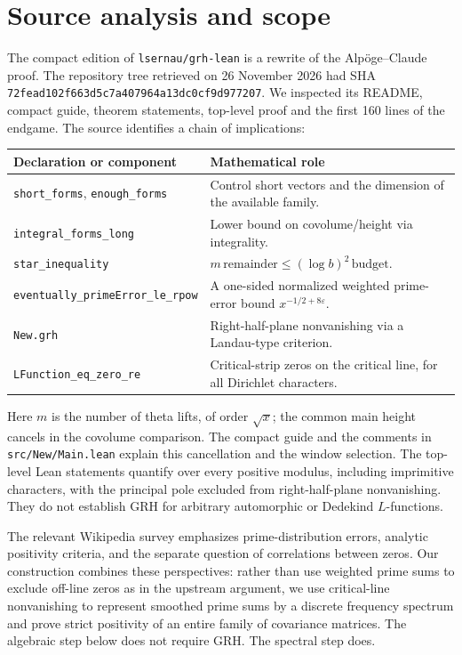 \documentclass[11pt]{article}
\theoremstyle{remark}\newtheorem{remark}[theorem]{Remark}
\begin{document}
\section{Source analysis and scope}
The compact edition of \texttt{lsernau/grh-lean} \cite{grh} is a rewrite of the Alp\"oge--Claude proof. The repository tree retrieved on 26 November 2026 had SHA \texttt{72fead102f663d5c7a407964a13dc0cf9d977207}. We inspected its README, compact guide, theorem statements, top-level proof and the first 160 lines of the endgame. The source identifies a chain of implications:
\begin{center}
\begin{tabular}{p{.39\linewidth}p{.51\linewidth}}
\toprule
Declaration or component & Mathematical role\\ \midrule
\texttt{short\_forms}, \texttt{enough\_forms} & Control short vectors and the dimension of the available family.\\
\texttt{integral\_forms\_long} & Lower bound on covolume/height via integrality.\\
\texttt{star\_inequality} & $m\,\mathrm{remainder}\le (\log b)^2\,\mathrm{budget}$.\\
\texttt{eventually\_primeError\_le\_rpow} & A one-sided normalized weighted prime-error bound $x^{-1/2+8\varepsilon}$.\\
\texttt{New.grh} & Right-half-plane nonvanishing via a Landau-type criterion.\\
\texttt{LFunction\_eq\_zero\_re} & Critical-strip zeros on the critical line, for all Dirichlet characters.\\ \bottomrule
\end{tabular}
\end{center}
Here $m$ is the number of theta lifts, of order $\sqrt{x}$; the common main height cancels in the covolume comparison. The compact guide and the comments in \texttt{src/New/Main.lean} explain this cancellation and the window selection. The top-level Lean statements quantify over every positive modulus, including imprimitive characters, with the principal pole excluded from right-half-plane nonvanishing. They do not establish GRH for arbitrary automorphic or Dedekind $L$-functions.

The relevant Wikipedia survey \cite{wiki} emphasizes prime-distribution errors, analytic positivity criteria, and the separate question of correlations between zeros. Our construction combines these perspectives: rather than use weighted prime sums to exclude off-line zeros as in the upstream argument, we use critical-line nonvanishing to represent smoothed prime sums by a discrete frequency spectrum and prove strict positivity of an entire family of covariance matrices. The algebraic step below does not require GRH. The spectral step does.
\end{document}
